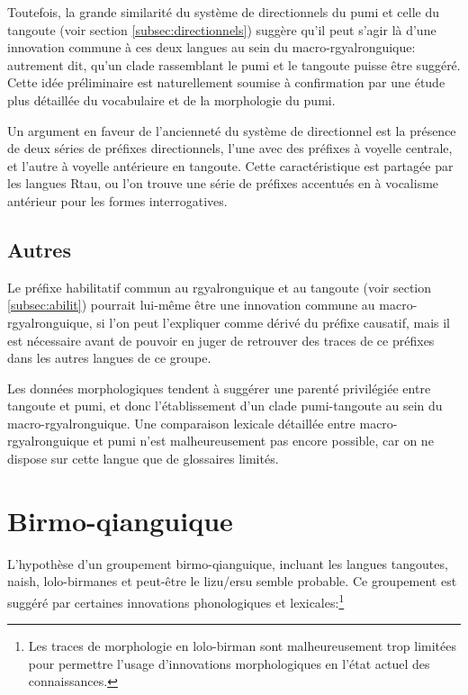 \documentclass[oldfontcommands,twoside,a4paper,11pt,draft]{memoir}
\begin{document}
Toutefois, la grande similarité du système de directionnels du pumi et celle du tangoute (voir section \ref{subsec:directionnels}) suggère qu'il peut s'agir là d'une innovation commune à ces deux langues au sein du macro-rgyalronguique: autrement dit, qu'un clade rassemblant le pumi et le tangoute puisse être suggéré. Cette idée préliminaire est naturellement soumise à confirmation par une étude plus détaillée du vocabulaire et de la morphologie du pumi.

Un argument en faveur de l'ancienneté du système de directionnel est la présence de deux séries de préfixes directionnels, l'une avec des préfixes à voyelle centrale, et l'autre à voyelle antérieure en tangoute. Cette caractéristique est partagée par les langues Rtau, ou l'on trouve une série de préfixes accentués en à vocalisme antérieur pour les formes interrogatives.

\subsection{Autres}

Le préfixe habilitatif commun au rgyalronguique et au tangoute (voir  section \ref{subsec:abilit}) pourrait lui-même être une innovation commune au macro-rgyalronguique, si l'on peut l'expliquer comme dérivé du préfixe causatif, mais il est nécessaire avant de pouvoir en juger de retrouver des traces de ce préfixes dans les autres langues de ce groupe.

Les données morphologiques tendent à suggérer une parenté privilégiée entre tangoute et pumi, et donc l'établissement d'un clade pumi-tangoute au sein du macro-rgyalronguique. Une comparaison lexicale détaillée entre macro-rgyalronguique et pumi n'est malheureusement pas encore possible, car on ne dispose sur cette langue que de glossaires limités.


\section{Birmo-qianguique}

L'hypothèse d'un groupement birmo-qianguique, incluant les langues tangoutes, naish, lolo-birmanes et peut-être le lizu/ersu semble probable. Ce groupement est suggéré par certaines innovations phonologiques et lexicales:\footnote{Les traces de morphologie en lolo-birman sont malheureusement trop limitées pour permettre l'usage d'innovations morphologiques en l'état actuel des connaissances.}
\end{document}
